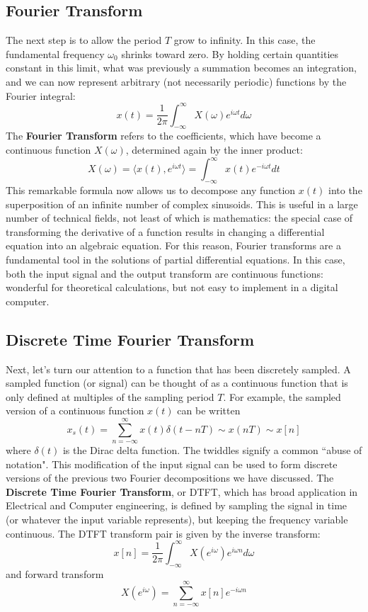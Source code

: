 \subsection{Fourier Transform}
The next step is to allow the period $T$ grow to infinity. In this case, the fundamental frequency $\omega_0$ shrinks toward zero. By holding certain quantities constant in this limit, what was previously a summation becomes an integration, and we can now represent arbitrary (not necessarily periodic) functions by the Fourier integral:
\[
x(t) = \dfrac{1}{2\pi}\int_{-\infty}^{\infty}X(\omega) e^{i\omega t}d\omega
\]
The \textbf{Fourier Transform} refers to the coefficients, which have become a continuous function $X(\omega)$, determined again by the inner product:
\[
X(\omega) = \langle x(t),e^{i\omega t}\rangle = \int_{-\infty}^{\infty} x(t) e^{-i\omega t} dt 
\]
This remarkable formula now allows us to decompose any function $x(t)$ into the superposition of an infinite number of complex sinusoids. This is useful in a large number of technical fields, not least of which is mathematics: the special case of transforming the derivative of a function results in changing a differential equation into an algebraic equation. For this reason, Fourier transforms are a fundamental tool in the solutions of partial differential equations. In this case, both the input signal and the output transform are continuous functions: wonderful for theoretical calculations, but not easy to implement in a digital computer.

\subsection{Discrete Time Fourier Transform}
Next, let's turn our attention to a function that has been discretely sampled. A sampled function (or signal) can be thought of as a continuous function that is only defined at multiples of the sampling period $T$. For example, the sampled version of a continuous function $x(t)$ can be written
\[
x_s(t) = \sum_{n=-\infty}^{\infty}x(t)\delta(t-nT) \sim x(nT) \sim x[n]
\]
where $\delta (t)$ is the Dirac delta function. The twiddles signify a common ``abuse of notation". This modification of the input signal can be used to form discrete versions of the previous two Fourier decompositions we have discussed. The \textbf{Discrete Time Fourier Transform}, or DTFT, which has broad application in Electrical and Computer engineering, is defined by sampling the signal in time (or whatever the input variable represents), but keeping the frequency variable continuous. The DTFT transform pair is given by the inverse transform:
\[
x[n] = \dfrac{1}{2\pi}\int_{-\infty}^{\infty}X(e^{i\omega})e^{i\omega n}d\omega
\]
and forward transform
\[
X(e^{i\omega}) = \sum_{n=-\infty}^{\infty}x[n]e^{-i\omega n}
\]

